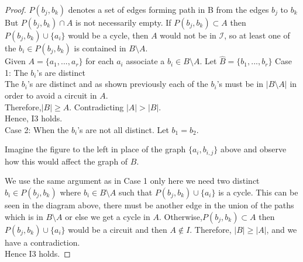\documentclass[../main.tex]{subfiles}
\begin{document}
\begin{proof}
\begin{minipage}{.2\textwidth}
\begin{tikzpicture}
\end{tikzpicture}  
 \end{minipage}
 
 \vspace{2mm}
 
 \noindent\Notation $P( b_j, b_k )$ denotes a set of edges forming path in B from the edges $ b_j $ to $ b_k $
\noindent But $ P(b_j,b_k) \cap A $ is not necessarily empty. If $P(b_j,b_k) \subset A$ then $P(b_j,b_k) \cup \{ a_i \}$  would be a cycle, then $A$ would not be in $\mathcal{I}$, so at least one of the $b_i \in P(b_j,b_k)$ is contained in $B \setminus A.$\\
\noindent Given $A = \{a_1, ... ,a_r\} $ for each $a_i$ associate a $b_i \in B \setminus A$. Let $\hat{B} = \{b_1, ... ,b_r\}$ 
\noindent Case 1: The $ b_i$'s are distinct\\
 The $b_i$'s are distinct and as shown previously each of the $b_i$'s must be in $|B \setminus A|$ in order to avoid a circuit in $A$.\\ 
\noindent Therefore,$|B| \geqslant A$. Contradicting $|A|>|B|.$\\
\noindent Hence, I3 holds.\\
\noindent Case 2: When the $b_i$'s are not all distinct.
\noindent Let $ b_1 = b_2 $.

\vspace{3mm}

\begin{minipage}{.2\textwidth}
\end{minipage}
\hspace{2.5cm} \begin{minipage}{.6\textwidth}
Imagine the figure to the left in place of the graph $\{a_i, b_{i,j}\}$ above and observe how this would affect the graph of $B.$
 \end{minipage}
\noindent We use the same argument as in Case 1 only here we need two distinct $b_i \in P( b_j, b_k)$ where $b_i \in B \setminus A$ such that  $P(b_j , b_k ) \cup \{ a_i \}$ is a cycle. This can be seen in the diagram above, there must be another edge in the union of the paths which is in $B \setminus A$ or else we get a cycle in $A.$ Otherwise,$P(b_j,b_k) \subset A$ then $P(b_j,b_k) \cup \{ a_i \}$  would be a circuit and then $A \notin I.$ Therefore, $|B| \geq |A|$, and we have a contradiction.\\
\noindent Hence I3 holds.
\end{proof}
 
\end{document}
